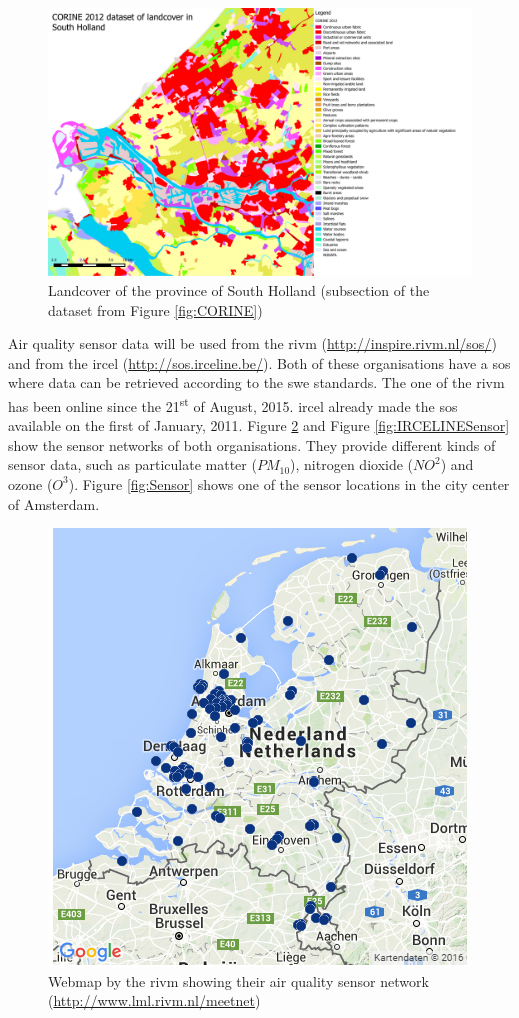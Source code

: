 \begin{figure}
	\centering
	\includegraphics[width=1\linewidth]{figs/CORINE_NL_BE_color_zoom.PDF}
	\caption{Landcover of the province of South Holland (subsection of the dataset from Figure \ref{fig:CORINE})}
	\label{fig:CORINEZOOM}
\end{figure}

Air quality sensor data will be used from the \ac{rivm} (\url{http://inspire.rivm.nl/sos/}) and from the \ac{ircel} (\url{http://sos.irceline.be/}). Both of these organisations have a \ac{sos} where data can be retrieved according to the \ac{swe} standards. The one of the \ac{rivm} has been online since the 21\textsuperscript{st} of August, 2015. \ac{ircel} already made the \ac{sos} available on the first of January, 2011. Figure \ref{fig:RIVMSensor} and Figure \ref{fig:IRCELINESensor} show the sensor networks of both organisations. They provide different kinds of sensor data, such as particulate matter ($PM_{10}$), nitrogen dioxide ($NO^{2}$) and ozone ($O^{3}$). Figure \ref{fig:Sensor} shows one of the sensor locations in the city center of Amsterdam. 


\begin{figure}
	\centering
	\includegraphics[width=0.6\linewidth]{figs/RIVMSensors.png}
	\caption{Webmap by the \ac{rivm} showing their air quality sensor network (\url{http://www.lml.rivm.nl/meetnet})}
	\label{fig:RIVMSensor}
\end{figure}

